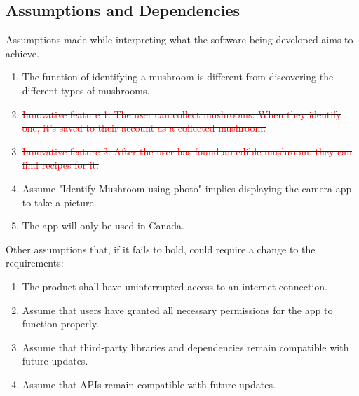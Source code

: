 \documentclass{article}
\begin{document}

\subsection{Assumptions and Dependencies}
\label{sub:assumptions_and_dependencies}
Assumptions made while interpreting what the software being developed aims to achieve.
\begin{enumerate}
	\item The function of identifying a mushroom is different from discovering the different types of mushrooms.
	\item \sout{\textcolor{red}{Innovative feature 1: The user can collect mushrooms. When they identify one, it's saved to their account as a collected mushroom.}}
	\item \sout{\textcolor{red}{Innovative feature 2: After the user has found an edible mushroom, they can find recipes for it.}}
	\item Assume "Identify Mushroom using photo" implies displaying the camera app to take a picture.
	\item The app will only be used in Canada.
\end{enumerate}

Other assumptions that, if it fails to hold, could require a change to the requirements:
\begin{enumerate}
	\item The product shall have uninterrupted access to an internet connection.
    \item Assume that users have granted all necessary permissions for the app to function properly.
    \item Assume that third-party libraries and dependencies remain compatible with future updates.
    \item Assume that APIs remain compatible with future updates.
\end{enumerate}
\end{document}
